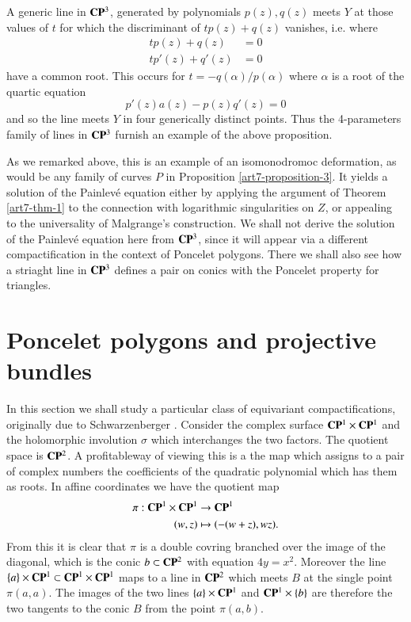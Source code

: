 \begin{example*}
\begin{enumerate}[]
A generic line in $\mathbf{C}\mathbf{P}^{3}$, generated by polynomials $p(z), q(z)$ meets $Y$ at those values of $t$ for which the discriminant of $tp(z) + q(z)$ vanishes, i.e. where
\begin{align*}
tp(z) +q(z) &= 0\\
tp'(z)+q'(z) &= 0
\end{align*}
have a common root. This occurs for $t = -q(\alpha)/p(\alpha)$ where $\alpha$ is a root of the quartic equation
$$
p'(z)a(z)-p(z)q'(z) =0
$$
and so the line meets $Y$ in four generically distinct points. Thus the 4-parameters family of lines in $\mathbf{C}\mathbf{P}^{3}$ furnish an example of the above proposition.
\end{enumerate}
As we remarked above, this is an example of an isomonodromoc deformation, as would be any family of curves $P$ in Proposition \ref{art7-proposition-3}. It yields a solution of the Painlev\'e equation either by applying the argument of Theorem \ref{art7-thm-1} to the connection with logarithmic singularities on $Z$, or appealing to the universality of Malgrange's construction. We shall not derive the solution of the Painlev\'e equation here from $\mathbf{C}\mathbf{P}^{3}$, since it will appear via a different compactification in the context of Poncelet polygons. There we shall also see how a striaght line in $\mathbf{C}\mathbf{P}^{3}$ defines a pair on conics with the Poncelet property for triangles.
\end{example*}

\section{Poncelet polygons and projective bundles}\label{art7-sec-4}

In this section we shall study a particular class of equivariant compactifications, originally due to Schwarzenberger \cite{art7-key16}. Consider the complex surface $\mathbf{C}\mathbf{P}^{1}\times \mathbf{C}\mathbf{P}^{1}$ and the holomorphic involution $\sigma$ which interchanges the two factors. The quotient space is $\mathbf{C}\mathbf{P}^{2}$. A profitableway of viewing this is a the map which assigns to a pair of complex numbers the coefficients of the quadratic polynomial which has them as roots. In affine coordinates we have the quotient map
\begin{align*}
\pi : \mathbf{C}\mathbf{P}^{1} \times \mathbf{C}\mathbf{P}^{1} &\rightarrow \mathbf{C}\mathbf{P}^{1}\\
(w, z) &\mapsto (-(w +z), wz).
\end{align*}
From this it is clear that $\pi$ is a double covring branched over the image of the diagonal, which is the
conic $b\subset \mathbf{C}\mathbf{P}^{2}$ with equation $4y =x^{2}$. Moreover the line $\{a\} \times \mathbf{C}\mathbf{P}^{1} \subset \mathbf{C}\mathbf{P}^{1} \times \mathbf{C}\mathbf{P}^{1}$ maps to a line in $\mathbf{C}\mathbf{P}^{2}$ which meets $B$ at the single point $\pi(a, a)$. The images of the two lines  $\{a\} \times \mathbf{C}\mathbf{P}^{1}$ and $\mathbf{C}\mathbf{P}^{1} \times \{b\}$ are therefore the two tangents to the conic $B$ from the point $\pi(a, b)$.

